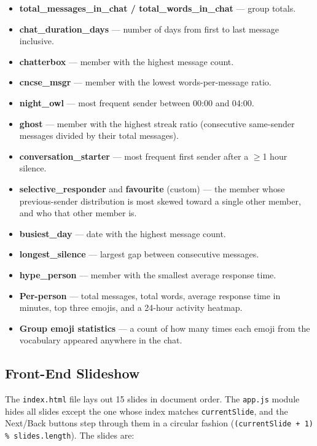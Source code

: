 \documentclass[12pt]{article}
\begin{document}
\begin{itemize}
    \item \textbf{total\_messages\_in\_chat / total\_words\_in\_chat} ---
    group totals.
    \item \textbf{chat\_duration\_days} --- number of days from first to last
    message inclusive.
    \item \textbf{chatterbox} --- member with the highest message count.
    \item \textbf{cncse\_msgr} --- member with the lowest words-per-message
    ratio.
    \item \textbf{night\_owl} --- most frequent sender between 00:00 and 04:00.
    \item \textbf{ghost} --- member with the highest streak ratio
    (consecutive same-sender messages divided by their total messages).
    \item \textbf{conversation\_starter} --- most frequent first sender after
    a $\geq$1 hour silence.
    \item \textbf{selective\_responder} and \textbf{favourite} (custom) ---
    the member whose previous-sender distribution is most skewed toward a
    single other member, and who that other member is.
    \item \textbf{busiest\_day} --- date with the highest message count.
    \item \textbf{longest\_silence} --- largest gap between consecutive
    messages.
    \item \textbf{hype\_person} --- member with the smallest average response
    time.
    \item \textbf{Per-person} --- total messages, total words, average response
    time in minutes, top three emojis, and a 24-hour activity heatmap.
    \item \textbf{Group emoji statistics} --- a count of how many times each
    emoji from the vocabulary appeared anywhere in the chat.
\end{itemize}


\subsection{Front-End Slideshow}

The \texttt{index.html} file lays out 15 slides in document order. The
\texttt{app.js} module hides all slides except the one whose index matches
\texttt{currentSlide}, and the Next/Back buttons step through them in a
circular fashion (\texttt{(currentSlide + 1) \% slides.length}). The slides
are:
\end{document}
